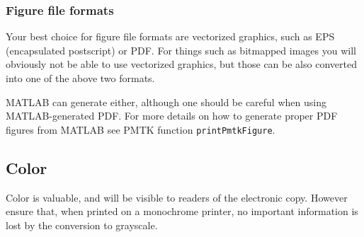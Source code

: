 \documentclass[10pt,twocolumn,letterpaper]{article}
\begin{document}
\subsubsection{Figure file formats}

Your best choice for figure file formats are vectorized graphics, such as EPS (encapsulated postscript) or PDF.  For things such as bitmapped images you will obviously not be able to use vectorized graphics, but those can be also converted into one of the above two formats.  

MATLAB can generate either, although one should be careful when using MATLAB-generated PDF.  For more details on how to generate proper PDF figures from MATLAB see PMTK function {\tt printPmtkFigure}.


\subsection{Color}

Color is valuable, and will be visible to readers of the electronic copy. However ensure that, when printed on a monochrome printer, no important information is lost by the conversion to grayscale.



{\small


}
\end{document}
